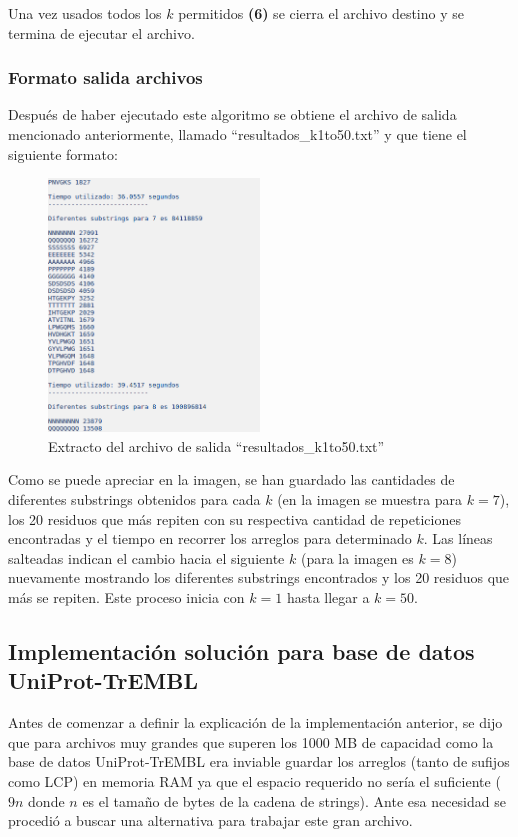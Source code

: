 Una vez usados todos los $k$ permitidos \textbf{(6)} se cierra el archivo destino y se termina de ejecutar el archivo.

\subsubsection{Formato salida archivos}

Después de haber ejecutado este algoritmo se obtiene el archivo de salida mencionado anteriormente, llamado ``resultados\_k1to50.txt'' y que tiene el siguiente formato:

\begin{figure}[h]
    \centering
    \includegraphics[width=0.5\textwidth]{./images/formatosalidaswissprot.png}
    \caption{Extracto del archivo de salida ``resultados\_k1to50.txt''}
\end{figure}

Como se puede apreciar en la imagen, se han guardado las cantidades de diferentes substrings obtenidos para cada $k$ (en la imagen se muestra para $k = 7$), los 20 residuos que más repiten con su respectiva cantidad de repeticiones encontradas y el tiempo en recorrer los arreglos para determinado $k$. Las líneas salteadas indican el cambio hacia el siguiente $k$ (para la imagen es $k=8$) nuevamente mostrando los diferentes substrings encontrados y los 20 residuos que más se repiten. Este proceso inicia con $k=1$ hasta llegar a $k=50$.

\subsection{Implementación solución para base de datos UniProt-TrEMBL}

Antes de comenzar a definir la explicación de la implementación anterior, se dijo que para archivos muy grandes que superen los 1000 MB de capacidad como la base de datos UniProt-TrEMBL era inviable guardar los arreglos (tanto de sufijos como LCP) en memoria RAM ya que el espacio requerido no sería el suficiente ($9n$ donde $n$ es el tamaño de bytes de la cadena de strings). Ante esa necesidad se procedió a buscar una alternativa para trabajar este gran archivo.

